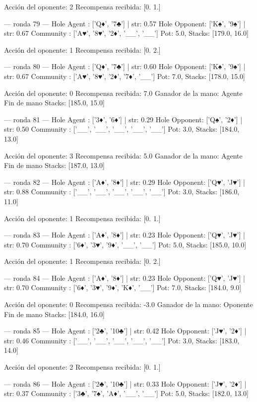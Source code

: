 Acción del oponente: 2
Recompensa recibida: [0. 1.]

--- ronda 79 ---
Hole Agent : ['Q♦', '7♣'] | str: 0.57
Hole Opponent: ['K♠', '9♠'] | str: 0.67
Community  : ['A♥', '8♥', '2♦', '__', '__']
Pot: 5.0, Stacks: [179.0, 16.0]

Acción del oponente: 1
Recompensa recibida: [0. 2.]

--- ronda 80 ---
Hole Agent : ['Q♦', '7♣'] | str: 0.60
Hole Opponent: ['K♠', '9♠'] | str: 0.67
Community  : ['A♥', '8♥', '2♦', '7♦', '__']
Pot: 7.0, Stacks: [178.0, 15.0]

Acción del oponente: 0
Recompensa recibida: 7.0
Ganador de la mano: Agente
Fin de mano Stacks: [185.0, 15.0]


--- ronda 81 ---
Hole Agent : ['3♦', '6♦'] | str: 0.29
Hole Opponent: ['Q♠', '2♦'] | str: 0.50
Community  : ['__', '__', '__', '__', '__']
Pot: 3.0, Stacks: [184.0, 13.0]

Acción del oponente: 3
Recompensa recibida: 5.0
Ganador de la mano: Agente
Fin de mano Stacks: [187.0, 13.0]


--- ronda 82 ---
Hole Agent : ['A♦', '8♦'] | str: 0.29
Hole Opponent: ['Q♥', 'J♥'] | str: 0.88
Community  : ['__', '__', '__', '__', '__']
Pot: 3.0, Stacks: [186.0, 11.0]

Acción del oponente: 1
Recompensa recibida: [0. 1.]

--- ronda 83 ---
Hole Agent : ['A♦', '8♦'] | str: 0.23
Hole Opponent: ['Q♥', 'J♥'] | str: 0.70
Community  : ['6♦', '3♥', '9♦', '__', '__']
Pot: 5.0, Stacks: [185.0, 10.0]

Acción del oponente: 1
Recompensa recibida: [0. 2.]

--- ronda 84 ---
Hole Agent : ['A♦', '8♦'] | str: 0.23
Hole Opponent: ['Q♥', 'J♥'] | str: 0.70
Community  : ['6♦', '3♥', '9♦', 'K♦', '__']
Pot: 7.0, Stacks: [184.0, 9.0]

Acción del oponente: 0
Recompensa recibida: -3.0
Ganador de la mano: Oponente
Fin de mano Stacks: [184.0, 16.0]


--- ronda 85 ---
Hole Agent : ['2♣', '10♣'] | str: 0.42
Hole Opponent: ['J♥', '2♦'] | str: 0.46
Community  : ['__', '__', '__', '__', '__']
Pot: 3.0, Stacks: [183.0, 14.0]

Acción del oponente: 2
Recompensa recibida: [0. 1.]

--- ronda 86 ---
Hole Agent : ['2♣', '10♣'] | str: 0.33
Hole Opponent: ['J♥', '2♦'] | str: 0.37
Community  : ['3♣', '7♠', 'A♦', '__', '__']
Pot: 5.0, Stacks: [182.0, 13.0]

